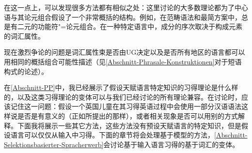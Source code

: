 在这一点上，可以发现很多方法都有相似之处：这里讨论的大多数理论都为了中心语与其论元组合假设了一个非常概括的结构。例如，在范畴语法和最简方案中，总是有二元的功能符"=论元组合。在一种特定语言中，成分的序次取决于构成元素的词汇属性。

现在激烈争论的问题是词汇属性束是否由UG决定\citep[--7]{Chomsky2007a}以及是否所有地区的语言都可以用相同的概括组合可能性描述（见\ref{Abschnitt-Phrasale-Konstruktionen}对于短语构式的论述）。

在\ref{Abschnitt-PP}中，我已经展示了假设天赋语言特定知识的习得理论是什么样的，以及这类习得理论的变体可以与我们已经讨论的所有理论兼容。在讨论时，应该记住这一问题：假设一个英国儿童在其习得英语过程中会使用一部分汉语语法这样说是否是有意义的（正如\citealp[]{Yang2004a}所提出的那样），或者相关现象是否可以用别的方式解释。下面我将展示一些其它方法，这些方法没有预设天赋语言的特定知识，但是假设语言可以仅仅从输入中习得。下面的章节将会处理基于模型的方法，\ref{Abschnitt-Selektionsbasierter-Spracherwerb}会讨论基于输入语言习得的基于词汇的变体。

